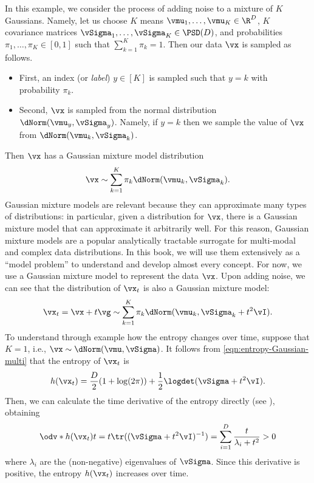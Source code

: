 \documentclass[../../book-main.tex]{subfiles}
\begin{document}
\begin{example}\label{ex:gaussian_mixture}
    In this example, we consider the process of adding noise to a mixture of \(K\) Gaussians. Namely, let us choose \(K\) means \(\vmu_{1}, \dots, \vmu_{K} \in \R^{D}\), \(K\) covariance matrices \(\vSigma_{1}, \dots, \vSigma_{K} \in \PSD(D)\), and probabilities \(\pi_{1}, \dots, \pi_{K} \in [0, 1]\) such that \(\sum_{k = 1}^{K}\pi_{k} = 1\). Then our data \(\vx\) is sampled as follows. 
	\begin{itemize}
		\item First, an index (or \textit{label}) \(y \in [K]\) is sampled such that \(y = k\) with probability \(\pi_{k}\).
		\item Second, \(\vx\) is sampled from the normal distribution \(\dNorm(\vmu_{y}, \vSigma_{y})\). Namely, if \(y = k\) then we sample the value of \(\vx\) from \(\dNorm(\vmu_{k}, \vSigma_{k})\).
	\end{itemize}
	Then \(\vx\) has a Gaussian mixture model distribution
	\begin{equation}
		\vx \sim \sum_{k = 1}^{K}\pi_{k}\dNorm(\vmu_{k}, \vSigma_{k}).
	\end{equation}
	Gaussian mixture models are relevant because they can approximate many types of distributions: in particular, given a distribution for \(\vx\), there is a Gaussian mixture model that can approximate it arbitrarily well. For this reason, Gaussian mixture models are a popular analytically tractable surrogate for multi-modal and complex data distributions. In this book, we will use them extensively as a ``model problem'' to understand and develop almost every concept. For now, we use a Gaussian mixture model to represent the data \(\vx\). Upon adding noise, we can see that the distribution of \(\vx_{t}\) is also a Gaussian mixture model:
	\begin{equation}
		\vx_{t} = \vx + t\vg \sim \sum_{k = 1}^{K}\pi_{k}\dNorm(\vmu_{k}, \vSigma_{k} + t^{2}\vI).
	\end{equation}
	To understand through example how the entropy changes over time, suppose that \(K=1\), i.e., \(\vx \sim \dNorm(\vmu, \vSigma)\). It follows from \eqref{eqn:entropy-Gaussian-multi} that the entropy of \(\vx_{t}\) is 
	\begin{equation}
		h(\vx_{t}) = \frac{D}{2}(1 + \log(2\pi)) + \frac{1}{2}\logdet(\vSigma + t^{2}\vI). 
	\end{equation}
	Then, we can calculate the time derivative of the entropy directly (see ), obtaining
	\begin{equation}
		\odv*{h(\vx_{t})}{t} = t\tr((\vSigma + t^{2}\vI)^{-1}) = \sum_{i = 1}^{D}\frac{t}{\lambda_{i} + t^{2}} > 0
	\end{equation}
	where \(\lambda_{i}\) are the (non-negative) eigenvalues of \(\vSigma\). Since this derivative is positive, the entropy \(h(\vx_{t})\) increases over time.
\end{example}
\end{document}
